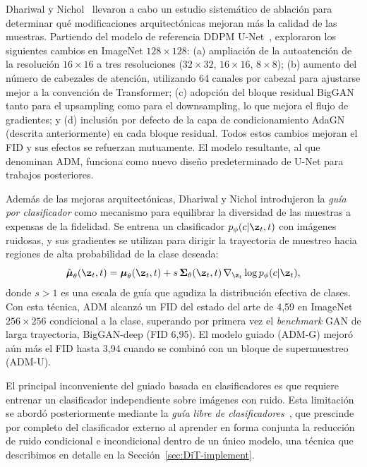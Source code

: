 \documentclass[../../book-main_es.tex]{subfiles}
\begin{document}
Dhariwal y Nichol~\citep{dhariwal2021diffusion} llevaron a cabo un estudio sistemático de 
ablación para determinar qué modificaciones arquitectónicas mejoran más la calidad de las 
muestras. Partiendo del modelo de referencia DDPM U-Net~\citep{ho2020denoising}, exploraron 
los siguientes cambios en ImageNet $128 \times 128$: (a) ampliación de la autoatención de la 
resolución $16 \times 16$ a tres resoluciones ($32 \times 32$, $16 \times 16$, $8 \times 8$); 
(b) aumento del número de cabezales de atención, utilizando 64 canales por cabezal para 
ajustarse mejor a la convención de Transformer; (c) adopción del bloque residual 
BigGAN~\citep{brock2019large} tanto para el upsampling como para el downsampling, lo que 
mejora el flujo de gradientes; y (d) inclusión por defecto de la capa de condicionamiento 
AdaGN (descrita anteriormente) en cada bloque residual. Todos estos cambios mejoran el FID y 
sus efectos se refuerzan mutuamente. El modelo resultante, al que denominan ADM, 
funciona como nuevo diseño predeterminado de U-Net para trabajos posteriores.

Además de las mejoras arquitectónicas, Dhariwal y Nichol introdujeron la \emph{guía 
por clasificador} como mecanismo para equilibrar la diversidad de las muestras a expensas de la fidelidad.
Se entrena un clasificador $p_\phi(c|\z_t, t)$ con imágenes ruidosas, y sus gradientes se utilizan 
para dirigir la trayectoria de muestreo hacia regiones de alta probabilidad de la clase deseada:
\begin{equation}
    \hat{\boldsymbol{\mu}}_\theta(\z_t, t) = \boldsymbol{\mu}_\theta(\z_t, t) + s \, \boldsymbol{\Sigma}_\theta(\z_t, t) \, \nabla_{\z_t} \log p_\phi(c|\z_t),
\end{equation}
donde $s > 1$ es una escala de guía que agudiza la distribución efectiva de clases. Con esta 
técnica, ADM alcanzó un FID del estado del arte de 4,59 en ImageNet $256 \times 256$ condicional a 
la clase, superando por primera vez el \textit{benchmark} GAN de larga trayectoria, BigGAN-deep (FID 6,95). 
El modelo guiado (ADM-G) mejoró aún más el FID hasta 3,94 
cuando se combinó con un bloque de supermuestreo (ADM-U).

El principal inconveniente del guiado basada en clasificadores es que requiere entrenar un 
clasificador independiente sobre imágenes con ruido. Esta limitación se abordó posteriormente 
mediante la \emph{guía libre de clasificadores}~\citep{ho2022classifier}, que prescinde por completo 
del clasificador externo al aprender en forma conjunta la reducción de ruido condicional e 
incondicional dentro de un único modelo, una técnica que describimos en detalle en 
la Sección~\ref{sec:DiT-implement}.
\end{document}
